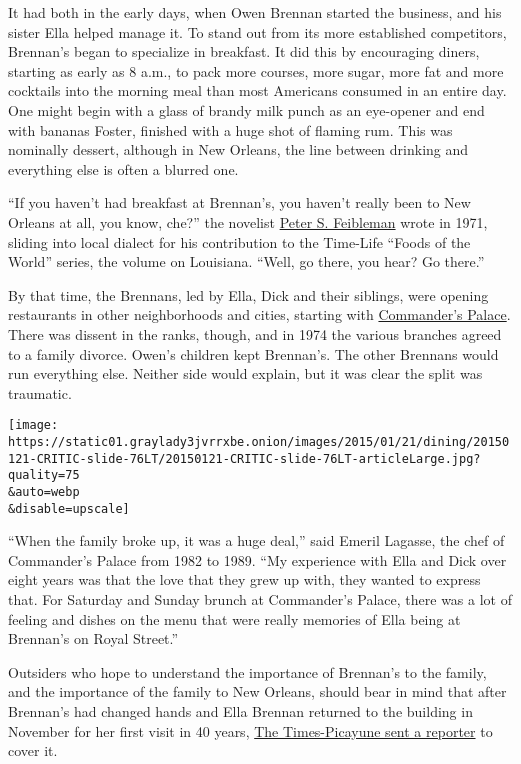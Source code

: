 It had both in the early days, when Owen Brennan started the business,
and his sister Ella helped manage it. To stand out from its more
established competitors, Brennan's began to specialize in breakfast. It
did this by encouraging diners, starting as early as 8 a.m., to pack
more courses, more sugar, more fat and more cocktails into the morning
meal than most Americans consumed in an entire day. One might begin with
a glass of brandy milk punch as an eye-opener and end with bananas
Foster, finished with a huge shot of flaming rum. This was nominally
dessert, although in New Orleans, the line between drinking and
everything else is often a blurred one.

``If you haven't had breakfast at Brennan's, you haven't really been to
New Orleans at all, you know, che?'' the novelist
\href{http://www.nytimes3xbfgragh.onion/2006/04/23/magazine/23food.html}{Peter
S. Feibleman} wrote in 1971, sliding into local dialect for his
contribution to the Time-Life ``Foods of the World'' series, the volume
on Louisiana. ``Well, go there, you hear? Go there.''

By that time, the Brennans, led by Ella, Dick and their siblings, were
opening restaurants in other neighborhoods and cities, starting with
\href{http://www.commanderspalace.com/}{Commander's Palace}. There was
dissent in the ranks, though, and in 1974 the various branches agreed to
a family divorce. Owen's children kept Brennan's. The other Brennans
would run everything else. Neither side would explain, but it was clear
the split was traumatic.

\texttt{[image: https://static01.graylady3jvrrxbe.onion/images/2015/01/21/dining/20150121-CRITIC-slide-76LT/20150121-CRITIC-slide-76LT-articleLarge.jpg?quality=75\\\&auto=webp\\\&disable=upscale]}

``When the family broke up, it was a huge deal,'' said Emeril Lagasse,
the chef of Commander's Palace from 1982 to 1989. ``My experience with
Ella and Dick over eight years was that the love that they grew up with,
they wanted to express that. For Saturday and Sunday brunch at
Commander's Palace, there was a lot of feeling and dishes on the menu
that were really memories of Ella being at Brennan's on Royal Street.''

Outsiders who hope to understand the importance of Brennan's to the
family, and the importance of the family to New Orleans, should bear in
mind that after Brennan's had changed hands and Ella Brennan returned to
the building in November for her first visit in 40 years,
\href{http://www.nola.com/dining/index.ssf/2014/11/ella_brennan_for_the_first_tim.html}{The
Times-Picayune sent a reporter} to cover it.

